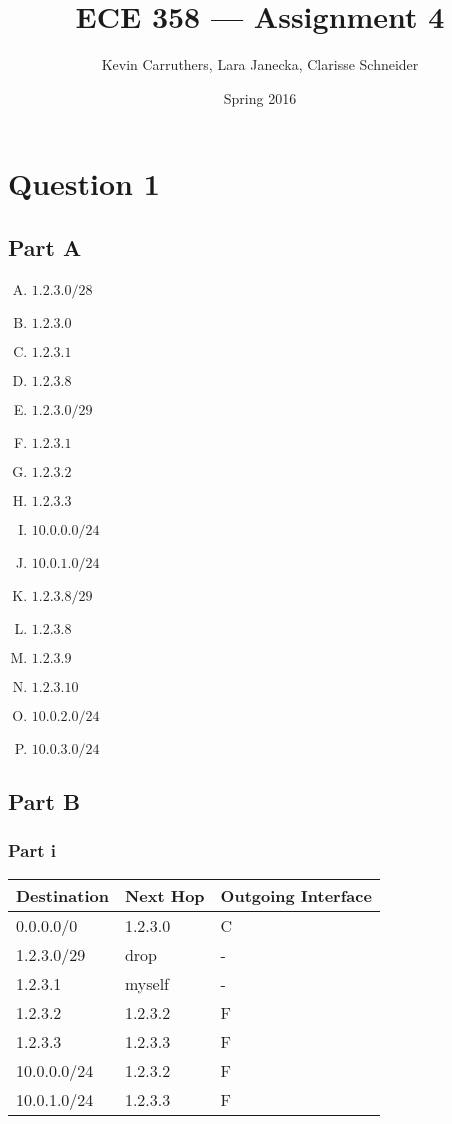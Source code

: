 \documentclass[12pt]{article}
\begin{document}
\title{ECE 358 --- Assignment 4}
\author{Kevin Carruthers, Lara Janecka, Clarisse Schneider}
\date{\vspace{-2ex}Spring 2016}
\maketitle\HRule

\section*{Question 1}
\subsection*{Part A}
\begin{enumerate}[A.]
\item $1.2.3.0/28$
\item $1.2.3.0$
\item $1.2.3.1$
\item $1.2.3.8$
\item $1.2.3.0/29$
\item $1.2.3.1$
\item $1.2.3.2$
\item $1.2.3.3$
\item $10.0.0.0/24$
\item $10.0.1.0/24$
\item $1.2.3.8/29$
\item $1.2.3.8$
\item $1.2.3.9$
\item $1.2.3.10$
\item $10.0.2.0/24$
\item $10.0.3.0/24$
\end{enumerate}

\subsection*{Part B}
\subsubsection*{Part i}
\begin{table}[ht]
\centering
\begin{tabular}{l|l|l}
Destination & Next Hop & Outgoing Interface \\ \hline
0.0.0.0/0   & 1.2.3.0  & C                  \\
1.2.3.0/29  & drop     & -                  \\
1.2.3.1     & myself   & -                  \\
1.2.3.2     & 1.2.3.2  & F                  \\
1.2.3.3     & 1.2.3.3  & F                  \\
10.0.0.0/24 & 1.2.3.2  & F                  \\
10.0.1.0/24 & 1.2.3.3  & F                  \\
\end{tabular}
\end{table}
\end{document}
